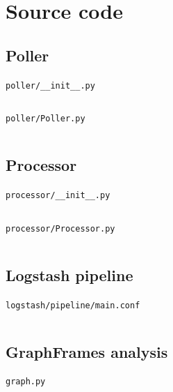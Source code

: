\documentclass[11pt]{article}
\newcommand{\codefile}[3]{\par\noindent\texttt{\small #2}\inputminted{#1}{#3}}
\begin{document}
\appendix
\section{Source code}
\subsection{Poller}
\codefile{python}{poller/\_\_init\_\_.py}{../../kafka-elk/services/poller/src/poller/__init__.py}
\codefile{python}{poller/Poller.py}{../../kafka-elk/services/poller/src/poller/Poller.py}
\subsection{Processor}
\codefile{python}{processor/\_\_init\_\_.py}{../../kafka-elk/services/processor/src/processor/__init__.py}
\codefile{python}{processor/Processor.py}{../../kafka-elk/services/processor/src/processor/Processor.py}
\subsection{Logstash pipeline}
\codefile{ruby}{logstash/pipeline/main.conf}{../../kafka-elk/logstash/pipeline/main.conf}
\subsection{GraphFrames analysis}
\codefile{python}{graph.py}{../src/assignment3_pt2/graph.py}
\end{document}

